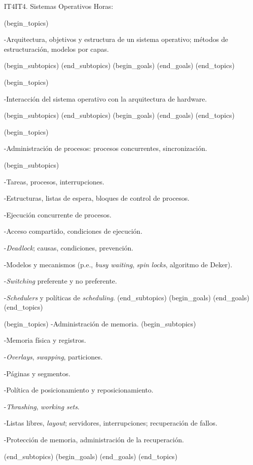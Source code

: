 \begin{BKL2}{IT4}{IT4. Sistemas Operativos}
Horas:
 
(begin_topics)

-Arquitectura, objetivos y estructura de un sistema operativo; métodos de estructuración, modelos por capas.

(begin_subtopics)
(end_subtopics)
(begin_goals)
(end_goals)
(end_topics)

 

(begin_topics)

-Interacción del sistema operativo con la arquitectura de hardware.

(begin_subtopics)
(end_subtopics)
(begin_goals)
(end_goals)
(end_topics)

 

(begin_topics)

-Administración de procesos: procesos concurrentes, sincronización.

(begin_subtopics)

-Tareas, procesos, interrupciones.

-Estructuras, listas de espera, bloques de control de procesos.

-Ejecución concurrente de procesos.

-Acceso compartido, condiciones de ejecución.

-{\it Deadlock}; causas, condiciones, prevención.

-Modelos y mecanismos (p.e., {\it busy waiting}, {\it spin locks}, algoritmo de Deker).

-{\it Switching} preferente y no preferente.

-{\it Schedulers} y políticas de {\it scheduling}.
(end_subtopics)
(begin_goals)
(end_goals)
(end_topics)

 

(begin_topics)
-Administración de memoria.
(begin_subtopics)

-Memoria física y registros.

-{\it Overlays}, {\it swapping}, particiones.

-Páginas y segmentos.

-Política de posicionamiento y reposicionamiento.

-{\it Thrashing}, {\it working sets}.

-Listas libres, {\it layout}; servidores, interrupciones; recuperación de fallos.

-Protección de memoria, administración de la recuperación.

(end_subtopics)
(begin_goals)
(end_goals)
(end_topics)


\end{BKL2}
